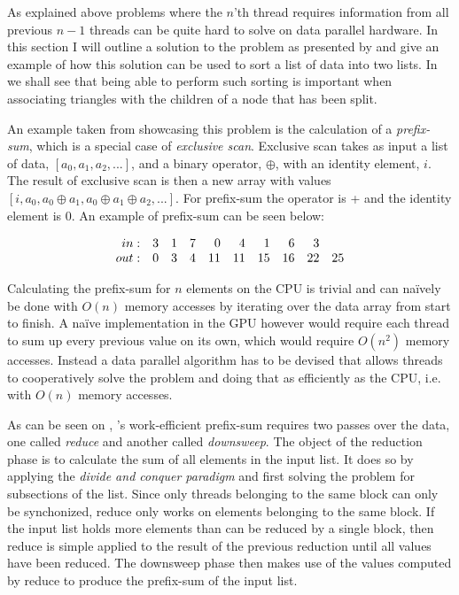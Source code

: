 
As explained above problems where the $n$’th thread requires information from
all previous $n-1$ threads can be quite hard to solve on data parallel
hardware. In this section I will outline a solution to the problem as presented
by \sengupta{} and give an example of how this solution can be used to sort a
list of data into two lists. In  we shall see that
being able to perform such sorting is important when associating triangles with
the children of a node that has been split.


An example taken from \sengupta{} showcasing this problem is the calculation of
a \textit{prefix-sum}, which is a special case of \textit{exclusive
  scan}. Exclusive scan takes as input a list of data, $[a_0, a_1, a_2, ...]$,
and a binary operator, $\oplus$, with an identity element, $i$. The result of
exclusive scan is then a new array with values $[i, a_0, a_0 \oplus a_1, a_0
  \oplus a_1 \oplus a_2, ...]$. For prefix-sum the operator is + and the
identity element is 0. An example of prefix-sum can be seen below:

\begin{displaymath}
  \begin{array}{r r r r r r r r r r}
    in: & 3 & 1 & 7 & 0 & 4 & 1 & 6 & 3 \\
    out: & 0 & 3 & 4 & 11 & 11 & 15 & 16 & 22 & 25 \\
  \end{array}
\end{displaymath}

Calculating the prefix-sum for $n$ elements on the CPU is trivial and can
naïvely be done with $O(n)$ memory accesses by iterating over the data array
from start to finish. A naïve implementation in the GPU however would require
each thread to sum up every previous value on its own, which would require
$O(n^2)$ memory accesses. Instead a data parallel algorithm has to be devised
that allows threads to cooperatively solve the problem and doing that as
efficiently as the CPU, i.e. with $O(n)$ memory accesses.



As can be seen on , \sengupta{}'s work-efficient prefix-sum
requires two passes over the data, one called \textit{reduce} and another called
\textit{downsweep}. The object of the reduction phase is to calculate the sum of
all elements in the input list. It does so by applying the \textit{divide and
  conquer paradigm} and first solving the problem for subsections of the
list. Since only threads belonging to the same block can only be synchonized,
reduce only works on elements belonging to the same block. If the input list
holds more elements than can be reduced by a single block, then reduce is simple
applied to the result of the previous reduction until all values have been
reduced. The downsweep phase then makes use of the values computed by reduce to
produce the prefix-sum of the input list.

